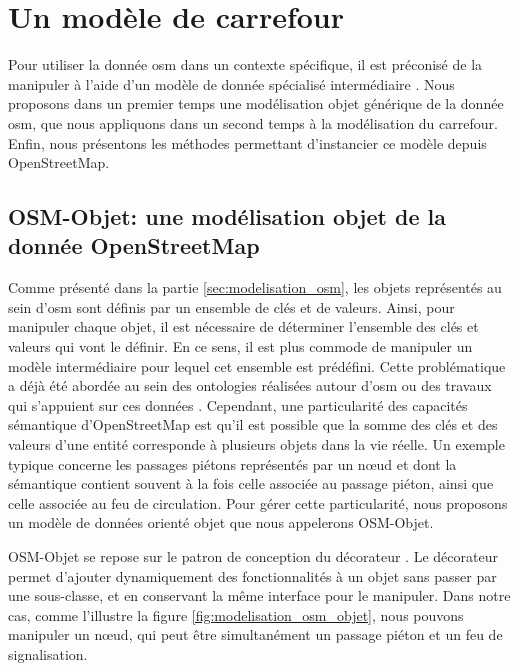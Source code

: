 \section{Un modèle de carrefour}

\label{sec:modelisation_crmodel}

Pour utiliser la donnée \gls{osm} dans un contexte spécifique, il est préconisé de la manipuler à l'aide d'un modèle de donnée spécialisé intermédiaire \citep{Touya2014}. Nous proposons dans un premier temps une modélisation objet générique de la donnée \gls{osm}, que nous appliquons dans un second temps à la modélisation du carrefour. Enfin, nous présentons les méthodes permettant d'instancier ce modèle depuis OpenStreetMap.

\subsection{OSM-Objet: une modélisation objet de la donnée OpenStreetMap}

Comme présenté dans la partie \ref{sec:modelisation_osm}, les objets représentés au sein d'\gls{osm} sont définis par un ensemble de clés et de valeurs. Ainsi, pour manipuler chaque objet, il est nécessaire de déterminer l'ensemble des clés et valeurs qui vont le définir. En ce sens, il est plus commode de manipuler un modèle intermédiaire pour lequel cet ensemble est prédéfini. Cette problématique a déjà été abordée au sein des ontologies réalisées autour d'\gls{osm}\citep{Codescu2011,Hombiat2017} ou des travaux qui s'appuient sur ces données \citep{Touya2014}. Cependant, une particularité des capacités sémantique d'OpenStreetMap est qu'il est possible que la somme des clés et des valeurs d'une entité corresponde à plusieurs objets dans la vie réelle. Un exemple typique concerne les passages piétons représentés par un nœud et dont la sémantique contient souvent à la fois celle associée au passage piéton, ainsi que celle associée au feu de circulation. Pour gérer cette particularité, nous proposons un modèle de données orienté objet que nous appelerons OSM-Objet.

\newpar{}

OSM-Objet se repose sur le patron de conception du décorateur \citep{Gamma1994a}. Le décorateur permet d'ajouter dynamiquement des fonctionnalités à un objet sans passer par une sous-classe, et en conservant la même interface pour le manipuler. Dans notre cas, comme l'illustre la figure \ref{fig:modelisation_osm_objet}, nous pouvons manipuler un nœud, qui peut être simultanément un passage piéton et un feu de signalisation.

